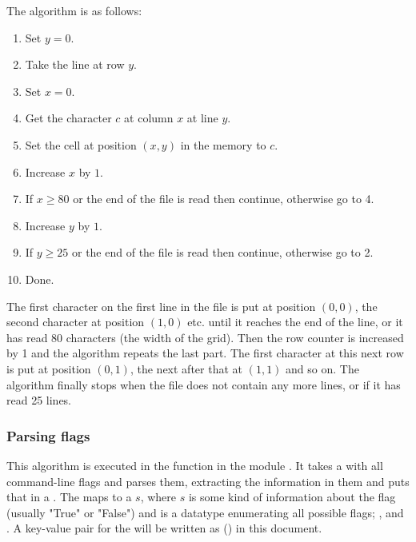 \documentclass[12pt, a4paper]{article}
\begin{document}
The algorithm is as follows:
\begin{enumerate}
\itemsep-0.5em
\item Set $y=0$.
\item Take the line at row $y$.
\item Set $x=0$.
\item Get the character $c$ at column $x$ at line $y$.
\item Set the cell at position $(x, y)$ in the memory to $c$.
\item Increase $x$ by $1$.
\item If $x \geq 80$ or the end of the file is read then continue, otherwise go to 4.
\item Increase $y$ by $1$.
\item If $y \geq 25$ or the end of the file is read then continue, otherwise go to 2.
\item Done.
\end{enumerate}

The first character on the first line in the file is put at position $(0, 0)$, the second character at position $(1, 0)$ etc. until it reaches the end of the line, or it has read 80 characters (the width of the grid). Then the row counter is increased by 1 and the algorithm repeats the last part. The first character at this next row is put at position $(0, 1)$, the next after that at $(1, 1)$ and so on. The algorithm finally stops when the file does not contain any more lines, or if it has read 25 lines.

\subsubsection{Parsing flags}
\label{sec:parseFlags}

This algorithm is executed in the function  in the module . It takes a \code{[String]} with all command-line flags and parses them, extracting the information in them and puts that in a . The  maps  to a  $s$, where $s$ is some kind of information about the flag (usually "True" or "False") and  is a datatype enumerating all possible flags; ,  and . A key-value pair for the  will be written as () in this document.
\end{document}
